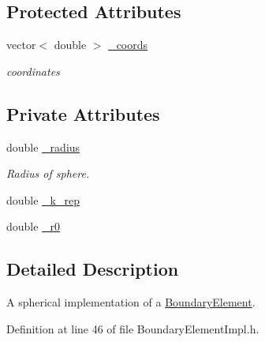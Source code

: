 \subsection*{Protected Attributes}
\begin{DoxyCompactItemize}
\item 
vector$<$ double $>$ \hyperlink{classBoundaryElement_ab51302e10e3e2def98438234ba5bf801}{\+\_\+coords}
\begin{DoxyCompactList}\small\item\em coordinates \end{DoxyCompactList}\end{DoxyCompactItemize}
\subsection*{Private Attributes}
\begin{DoxyCompactItemize}
\item 
double \hyperlink{classSphereBoundaryElement_a292f2562c66472f77e516ea19121f360}{\+\_\+radius}
\begin{DoxyCompactList}\small\item\em Radius of sphere. \end{DoxyCompactList}\item 
double \hyperlink{classSphereBoundaryElement_a4bca6baf26a3fb1718aaaed348646a58}{\+\_\+k\+\_\+rep}
\item 
double \hyperlink{classSphereBoundaryElement_a3e80ad9724c8ae7ff03631b4f2f84d1b}{\+\_\+r0}
\end{DoxyCompactItemize}


\subsection{Detailed Description}
A spherical implementation of a \hyperlink{classBoundaryElement}{Boundary\+Element}. 

Definition at line 46 of file Boundary\+Element\+Impl.\+h.



